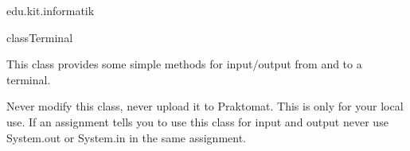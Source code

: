\begin{texdocpackage}{edu.kit.informatik}
\begin{texdocclass}{class}{Terminal}
\label{texdoclet:edu.kit.informatik.Terminal}
\begin{texdocclassintro}
This class provides some simple methods for input$/$output from and to a
 terminal.
 \begin{texdocp}
 Never modify this class, never upload it to Praktomat. This is only for your
 local use. If an assignment tells you to use this class for input and output
 never use System.out or System.in in the same assignment.\end{texdocp}\end{texdocclassintro}
\begin{texdocclassmethods}
\end{texdocclassmethods}
\end{texdocclass}


\end{texdocpackage}




